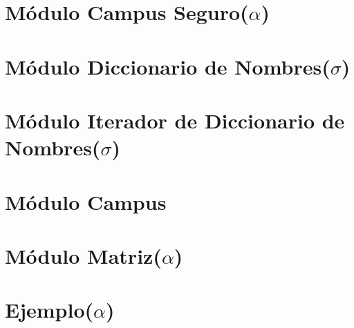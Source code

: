\documentclass[a4paper,10pt, nofootinbib]{article}
\begin{document}
\thispagestyle{empty}

\maketitle

\tableofcontents
\newpage


\clearpage


\section{Módulo Campus Seguro($\alpha$)}


\clearpage
\section{Módulo Diccionario de Nombres($\sigma$)}


\clearpage
\section{Módulo Iterador de Diccionario de Nombres($\sigma$)}


\clearpage
\section{Módulo Campus}


\clearpage
\section{Módulo Matriz($\alpha$)}


\clearpage
\section{Ejemplo($\alpha$)}

\end{document}
